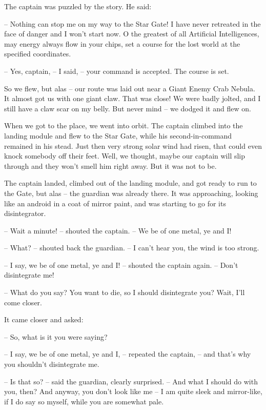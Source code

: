 \documentclass[ebook,twoside,final,openright]{memoir}
\begin{document}
The captain was puzzled by the story. He said:\par
– Nothing can stop me on my way to the Star Gate! I have never retreated in the face of danger and I won’t start now. O the greatest of all Artificial Intelligences, may energy always flow in your chips, set a course for the lost world at the specified coordinates.\par
– Yes, captain, – I said, – your command is accepted. The course is set.\par
So we flew, but alas – our route was laid out near a Giant Enemy Crab Nebula. It almost got us with one giant claw. That was close! We were badly jolted, and I still have a claw scar on my belly. But never mind – we dodged it and flew on. \par
\par
When we got to the place, we went into orbit. The captain climbed into the landing module and flew to the Star Gate, while his second-in-command remained in his stead. Just then very strong solar wind had risen, that could even knock somebody off their feet. Well, we thought, maybe our captain will slip through and they won’t smell him right away. But it was not to be.\par
\par
The captain landed, climbed out of the landing module, and got ready to run to the Gate, but alas – the guardian was already there. It was approaching, looking like an android in a coat of mirror paint, and was starting to go for its disintegrator.\par
– Wait a minute! – shouted the captain. – We be of one metal, ye and I!\par
– What? – shouted back the guardian. – I can’t hear you, the wind is too strong.\par
– I say, we be of one metal, ye and I! – shouted the captain again. – Don’t disintegrate me!\par
– What do you say? You want to die, so I should disintegrate you? Wait, I'll come closer.\par
\par
It came closer and asked:\par
– So, what is it you were saying?\par
– I say, we be of one metal, ye and I, – repeated the captain, – and that’s why you shouldn’t disintegrate me.\par
– Is that so? – said the guardian, clearly surprised. – And what I should do with you, then? And anyway, you don’t look like me – I am quite sleek and mirror-like, if I do say so myself, while you are somewhat pale.\par
\end{document}
